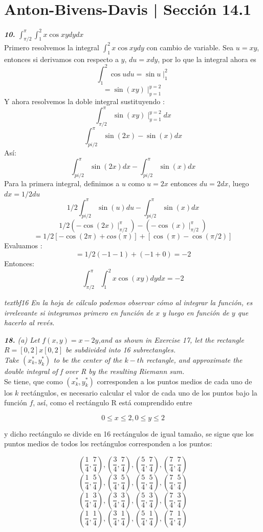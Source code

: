 \documentclass[a4paper,12pt]{article}
\begin{document}
	\section{Anton-Bivens-Davis | Sección 14.1}
	\textit{\textbf{10.} $\int^{\pi}_{\pi / 2}\int^2_1 x \cos xy dy dx$}\\

Primero resolvemos la integral $\int^2_1 x \cos xy dy$ con cambio de variable. Sea $u= xy$, entonces si derivamos con respecto a $y$,  $du = x dy$, por lo que la integral ahora es
\[\int^2_1 \cos u du = \sin u\mid ^2 _1\]
\[= \sin(xy) \mid^{y=2}_{y=1}\]
Y ahora resolvemos la doble integral sustituyendo :
\[\int^\pi_{\pi / 2} \sin(xy) \mid^{y=2}_{y=1} dx\]
\[\int^\pi_{pi / 2} \sin(2x)-\sin(x) dx\]
Así:
\[\int^\pi_{pi / 2} \sin(2x) dx - \int^\pi_{pi / 2} \sin(x) dx\]
Para la primera integral, definimos a $u$ como $u = 2x$ entonces $du = 2 dx$, luego $dx = 1/2 du$
\[1/2 \int^\pi_{pi / 2}\sin(u) du - \int^\pi_{pi / 2} \sin(x) dx\]
\[1/2(-\cos(2x)\mid^\pi_{\pi / 2})-(-\cos(x)\mid^\pi_{\pi / 2}) \]
\[= 1/2[-\cos(2\pi)+cos(\pi)]+ [\cos(\pi)-\cos(\pi / 2)] \]
Evaluamos :
\[= 1/2(-1-1)+(-1+0) = -2\]
Entonces:
\[\int^{\pi}_{\pi / 2}\int^2_1 x \cos(xy) dy dx = -2\]

	\textit{textbf{16} En la hoja de cálculo podemos observar cómo al integrar la función, es irrelevante si integramos primero en función de $x$ y luego en función de $y$ que hacerlo al revés.}

	\textit{\textbf{18.} (a) Let $f(x,y) = x - 2y$,and as shown in Exercise 17,
	let the rectangle $ R = [0, 2] x [0, 2]$ be subdivided into 16 subrectangles.\\
	\newline
	Take $(x^{*}_{k}, y^{*}_{k})$ to be the center of the $k-th$ rectangle, and approximate
	the double integral of f over R by the resulting Riemann sum.}\\

	Se tiene, que como $(x^{*}_{k}, y^{*}_{k})$ corresponden a los puntos medios
	de cada uno de los $k$ rectángulos, es necesario calcular el valor de cada
	uno de los puntos bajo la función $f$, así, como el rectángulo R está
	comprendido entre

		$$ 0 \leq x \leq 2, 0 \leq y \leq 2  $$

	y dicho rectángulo se divide en 16 rectángulos de igual tamaño, se sigue que
	los puntos medios de todos los rectángulos corresponden a los puntos:

		$$ (\frac{1}{4}, \frac{7}{4}), (\frac{3}{4}, \frac{7}{4}),
			(\frac{5}{4}, \frac{7}{4}), (\frac{7}{4}, \frac{7}{4}) $$
		$$ (\frac{1}{4}, \frac{5}{4}), (\frac{3}{4}, \frac{5}{4}),
			(\frac{5}{4}, \frac{5}{4}), (\frac{7}{4}, \frac{5}{4}) $$
		$$ (\frac{1}{4}, \frac{3}{4}), (\frac{3}{4}, \frac{3}{4}),
			(\frac{5}{4}, \frac{3}{4}), (\frac{7}{4}, \frac{3}{4}) $$
		$$ (\frac{1}{4}, \frac{1}{4}), (\frac{3}{4}, \frac{1}{4}),
			(\frac{5}{4}, \frac{1}{4}), (\frac{7}{4}, \frac{1}{4}) $$
\end{document}
